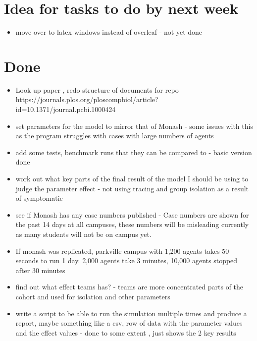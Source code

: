 \documentclass{article}
\begin{document}
\section{Idea for tasks to do by next week}
\begin{itemize}

\item move over to latex windows instead of overleaf - not yet done
\end{itemize}

\section{Done}
\begin{itemize}
\item Look up paper , redo structure of documents for repo https://journals.plos.org/ploscompbiol/article?id=10.1371/journal.pcbi.1000424

\item set parameters for the model to mirror that of Monash - some issues with this as the program struggles with cases with large numbers of agents

\item add some tests, benchmark runs that they can be compared to - basic version done

\item work out what key parts of the final result of the model I should be using to judge the parameter effect - not using tracing and group isolation as a result of symptomatic

\item see if Monash has any case numbers published - Case numbers are shown for the past 14 days at all campuses, these numbers will be misleading currently as many students will not be on campus yet.  
\item If monash was replicated, parkville campus with 1,200 agents takes 50 seconds to run 1 day. 2,000 agents take 3 minutes, 10,000 agents stopped after 30 minutes

\item find out what effect teams has? - teams are more concentrated parts of the cohort and used for isolation and other parameters

\item write a script to be able to run the simulation multiple times and produce a report, maybe something like a csv, row of data with the parameter values and the effect values - done to some extent , just shows the 2 key results

\end{itemize}
\end{document}
